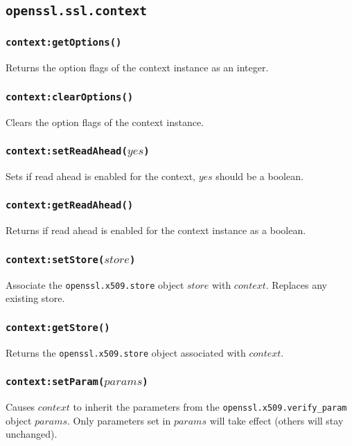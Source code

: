\documentclass[11pt, oneside]{memoir}
\newcommand*{\fn}[1]{\texttt{#1}\xspace}
\newcommand*{\module}[1]{\texttt{#1}\xspace}
\newcounter{toccols}
\newenvironment{Module}[1]{
	\subsection{\texttt{#1}}
	\addtocontents{toc}{
		\protect\begin{multicols}{\value{toccols}}
	}
}{
	\addtocontents{toc}{\protect\end{multicols}}
}
\begin{document}
\begin{Module}{openssl.ssl.context}
\subsubsection[\fn{context:getOptions}]{\fn{context:getOptions()}}

Returns the option flags of the context instance as an integer.

\subsubsection[\fn{context:clearOptions}]{\fn{context:clearOptions()}}

Clears the option flags of the context instance.

\subsubsection[\fn{context:setReadAhead}]{\fn{context:setReadAhead($yes$)}}

Sets if read ahead is enabled for the context, $yes$ should be a boolean.

\subsubsection[\fn{context:getReadAhead}]{\fn{context:getReadAhead()}}

Returns if read ahead is enabled for the context instance as a boolean.

\subsubsection[\fn{context:setStore}]{\fn{context:setStore($store$)}}

Associate the \module{openssl.x509.store} object $store$ with $context$. Replaces any existing store.

\subsubsection[\fn{context:getStore}]{\fn{context:getStore()}}

Returns the \module{openssl.x509.store} object associated with $context$.

\subsubsection[\fn{context:setParam}]{\fn{context:setParam($params$)}}

Causes $context$ to inherit the parameters from the \module{openssl.x509.verify\_param} object $params$.
Only parameters set in $params$ will take effect (others will stay unchanged).


\end{Module}
\end{document}
